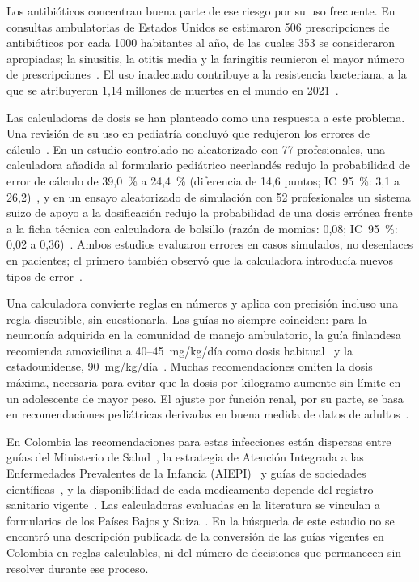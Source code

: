 \documentclass[11pt,a4paper]{article}
\begin{document}
Los antibióticos concentran buena parte de ese riesgo por su uso frecuente. En consultas ambulatorias de Estados Unidos se estimaron 506 prescripciones de antibióticos por cada \num{1000} habitantes al año, de las cuales 353 se consideraron apropiadas; la sinusitis, la otitis media y la faringitis reunieron el mayor número de prescripciones~\citep{flemingdutra2016}. El uso inadecuado contribuye a la resistencia bacteriana, a la que se atribuyeron 1,14 millones de muertes en el mundo en 2021~\citep{gbdamr2024}.

Las calculadoras de dosis se han planteado como una respuesta a este problema. Una revisión de su uso en pediatría concluyó que redujeron los errores de cálculo~\citep{stultz2012}. En un estudio controlado no aleatorizado con 77 profesionales, una calculadora añadida al formulario pediátrico neerlandés redujo la probabilidad de error de cálculo de 39,0~\% a 24,4~\% (diferencia de 14,6 puntos; IC~95~\%: 3,1 a 26,2)~\citep{vanderzanden2020}, y en un ensayo aleatorizado de simulación con 52 profesionales un sistema suizo de apoyo a la dosificación redujo la probabilidad de una dosis errónea frente a la ficha técnica con calculadora de bolsillo (razón de momios: 0,08; IC~95~\%: 0,02 a 0,36)~\citep{higi2023}. Ambos estudios evaluaron errores en casos simulados, no desenlaces en pacientes; el primero también observó que la calculadora introducía nuevos tipos de error~\citep{vanderzanden2020}.

Una calculadora convierte reglas en números y aplica con precisión incluso una regla discutible, sin cuestionarla. Las guías no siempre coinciden: para la neumonía adquirida en la comunidad de manejo ambulatorio, la guía finlandesa recomienda amoxicilina a 40--45~mg/kg/día como dosis habitual~\citep{backman2025} y la estadounidense, 90~mg/kg/día~\citep{bradley2011}. Muchas recomendaciones omiten la dosis máxima, necesaria para evitar que la dosis por kilogramo aumente sin límite en un adolescente de mayor peso. El ajuste por función renal, por su parte, se basa en recomendaciones pediátricas derivadas en buena medida de datos de adultos~\citep{schijvens2020,minotti2022}.

En Colombia las recomendaciones para estas infecciones están dispersas entre guías del Ministerio de Salud~\citep{gpc42}, la estrategia de Atención Integrada a las Enfermedades Prevalentes de la Infancia (AIEPI)~\citep{aiepi2012} y guías de sociedades científicas~\citep{acorloma2024,acorlfaa2024,acorlrs2024,acin2023,itucol2023}, y la disponibilidad de cada medicamento depende del registro sanitario vigente~\citep{invima}. Las calculadoras evaluadas en la literatura se vinculan a formularios de los Países Bajos y Suiza~\citep{vanderzanden2020,higi2023}. En la búsqueda de este estudio no se encontró una descripción publicada de la conversión de las guías vigentes en Colombia en reglas calculables, ni del número de decisiones que permanecen sin resolver durante ese proceso.
\end{document}

